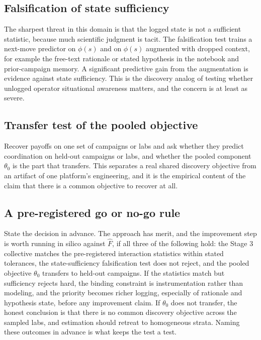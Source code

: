 \documentclass[11pt]{article}
\theoremstyle{definition}
\begin{document}
\subsection{Falsification of state sufficiency}

The sharpest threat in this domain is that the logged state is not a sufficient statistic, because much scientific judgment is tacit. The falsification test trains a next-move predictor on $\phi(s)$ and on $\phi(s)$ augmented with dropped context, for example the free-text rationale or stated hypothesis in the notebook and prior-campaign memory. A significant predictive gain from the augmentation is evidence against state sufficiency. This is the discovery analog of testing whether unlogged operator situational awareness matters, and the concern is at least as severe.

\subsection{Transfer test of the pooled objective}

Recover payoffs on one set of campaigns or labs and ask whether they predict coordination on held-out campaigns or labs, and whether the pooled component $\theta_0$ is the part that transfers. This separates a real shared discovery objective from an artifact of one platform's engineering, and it is the empirical content of the claim that there is a common objective to recover at all.

\subsection{A pre-registered go or no-go rule}

State the decision in advance. The approach has merit, and the improvement step is worth running in silico against $\hat F$, if all three of the following hold: the Stage 3 collective matches the pre-registered interaction statistics within stated tolerances, the state-sufficiency falsification test does not reject, and the pooled objective $\theta_0$ transfers to held-out campaigns. If the statistics match but sufficiency rejects hard, the binding constraint is instrumentation rather than modeling, and the priority becomes richer logging, especially of rationale and hypothesis state, before any improvement claim. If $\theta_0$ does not transfer, the honest conclusion is that there is no common discovery objective across the sampled labs, and estimation should retreat to homogeneous strata. Naming these outcomes in advance is what keeps the test a test.
\end{document}
